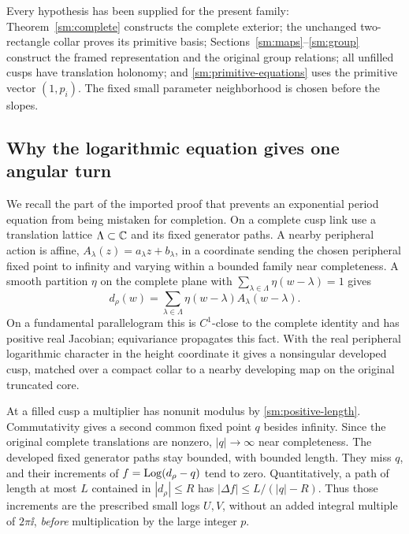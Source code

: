 Every hypothesis has been supplied for the present family:
Theorem~\ref{sm:complete} constructs the complete exterior;
the unchanged two-rectangle collar proves its primitive basis;
Sections~\ref{sm:maps}--\ref{sm:group} construct the framed
representation and the original group relations; all unfilled
cusps have translation holonomy; and \eqref{sm:primitive-equations}
uses the primitive vector $(1,p_i)$. The fixed small parameter
neighborhood is chosen before the slopes.

\subsection{Why the logarithmic equation gives one angular turn}
We recall the part of the imported proof that prevents an exponential
period equation from being mistaken for completion. On a complete
cusp link use a translation lattice $\Lambda\subset\mathbb C$ and its fixed
generator paths. A nearby peripheral action is affine,
$A_\lambda(z)=a_\lambda z+b_\lambda$, in a coordinate sending the chosen peripheral fixed point to infinity
and varying within a bounded family near completeness. A smooth partition $\eta$ on the complete plane with
$\sum_{\lambda\in\Lambda}\eta(w-\lambda)=1$ gives
\[
 d_\rho(w)=\sum_{\lambda\in\Lambda}
                    \eta(w-\lambda)A_\lambda(w-\lambda).
\]
On a fundamental parallelogram this is $C^1$-close to the complete
identity and has positive real Jacobian; equivariance propagates
this fact. With the real peripheral logarithmic character in the
height coordinate it gives a nonsingular developed cusp, matched
over a compact collar to a nearby developing map on the original
truncated core.

At a filled cusp a multiplier has nonunit modulus by
\eqref{sm:positive-length}. Commutativity gives a second common
fixed point $q$ besides infinity. Since the original complete
translations are nonzero, $|q|\to\infty$ near completeness.
The developed fixed generator paths stay bounded, with bounded
length. They miss $q$, and their increments of
$f=\operatorname{Log}(d_\rho-q)$ tend to zero. Quantitatively, a path of length
at most $L$ contained in $|d_\rho|\le R$ has
$|\Delta f|\le L/(|q|-R)$.
Thus those increments are the prescribed small logs $U,V$,
without an added integral multiple of $2\pi\ii$, \emph{before}
multiplication by the large integer $p$.

